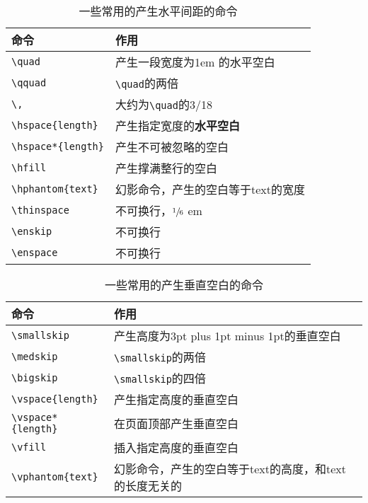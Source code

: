 \begin{table}[!htbp]
    \centering
    \caption{一些常用的产生水平间距的命令}
    \begin{tabular}{ll}
        \toprule
        命令 & 作用\\
        \midrule
        \verb|\quad| & 产生一段宽度为1em 的水平空白\\
        \verb|\qquad| & \verb|\quad|的两倍\\
        \verb|\,| & 大约为\verb|\quad|的3/18\\
        \verb|\hspace{length}| & 产生指定宽度的\textbf{水平空白}\\
        \verb|\hspace*{length}| & 产生不可被忽略的空白\\
        \verb|\hfill| & 产生撑满整行的空白\\
        \verb|\hphantom{text}| & 幻影命令，产生的空白等于text的宽度\\
        \verb|\thinspace| & 不可换行，$ \sfrac{1}{6} $ em\\
        \verb|\enskip| & 不可换行\\
        \verb|\enspace| & 不可换行\\
        \bottomrule
    \end{tabular}
\end{table}


\begin{table}[!htbp]
    \centering
    \caption{一些常用的产生垂直空白的命令}
    \begin{tabular}{ll}
    \toprule
    命令 & 作用\\
    \midrule
    \verb|\smallskip| & 产生高度为3pt plus 1pt minus 1pt的垂直空白\\
    \verb|\medskip| & \verb|\smallskip|的两倍\\
    \verb|\bigskip| & \verb|\smallskip|的四倍\\
    \verb|\vspace{length}| & 产生指定高度的垂直空白\\
    \verb|\vspace*{length}| & 在页面顶部产生垂直空白\\
    \verb|\vfill| & 插入指定高度的垂直空白\\
    \verb|\vphantom{text}| & 幻影命令，产生的空白等于text的高度，和text的长度无关的\\
    \bottomrule
    \end{tabular}
\end{table}

